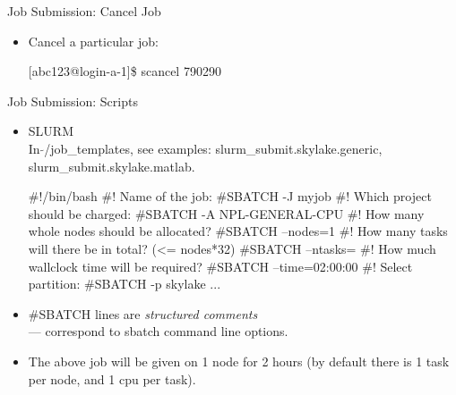 \begin{frame}[fragile]{Job Submission: Cancel Job}
\begin{itemize}
\item{Cancel a particular job:}
\begin{semiverbatim}
\scriptsize
[abc123@login-a-1]\$ scancel {\color{red}790290}
\end{semiverbatim}
\end{itemize}
\end{frame}

\begin{frame}[fragile]{Job Submission: Scripts}
\begin{itemize}
\item{SLURM\hfill\\
In \alert{$\tilde{}$/job\_templates}, see examples: \alert{slurm\_submit.skylake.generic}, \alert{slurm\_submit.skylake.matlab}.}
  
\begin{semiverbatim}
\tiny
#!/bin/bash
#! Name of the job:
{\color<2->{red}#SBATCH} -J myjob
#! Which project should be charged:
{\color<2->{red}#SBATCH} -A NPL-GENERAL-CPU
#! How many whole nodes should be allocated?
{\color<2->{red}#SBATCH} --nodes=1
#! How many tasks will there be in total? (<= nodes*32)
{\color<2->{red}#SBATCH} --ntasks={}
#! How much wallclock time will be required?
{\color<2->{red}#SBATCH} --time=02:00:00
#! Select partition:
{\color<2->{red}#SBATCH} -p skylake
...
\end{semiverbatim}
\item<2->{{\color{red}\#SBATCH} lines are \emph{structured comments}\hfill\\
\qquad --- correspond to sbatch command line options.}
\item<3->{\alert{The above job will be given {} on 1 node for 2 hours (by default there is 1 task per node, and 1 cpu per task).}}
\end{itemize}
\end{frame}

